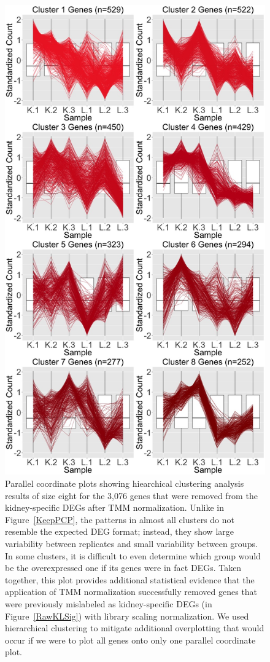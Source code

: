 \documentclass{article}
\begin{document}
\null
\begin{figure}[t!]
\centerline{\includegraphics[width=0.65\columnwidth]{../Bioinformatics/Pictures/liverKidney/Clustering_data_FDR_001_TMMvRaw_Removed/K_L_8.jpg}}
\caption{Parallel coordinate plots showing hiearchical clustering analysis results of size eight for the 3,076 genes that were removed from the kidney-specific DEGs after TMM normalization. Unlike in Figure~\ref{KeepPCP}, the patterns in almost all clusters do not resemble the expected DEG format; instead, they show large variability between replicates and small variability between groups. In some clusters, it is difficult to even determine which group would be the overexpressed one if its genes were in fact DEGs. Taken together, this plot provides additional statistical evidence that the application of TMM normalization successfully removed genes that were previously mislabeled as kidney-specific DEGs (in Figure~\ref{RawKLSig}) with library scaling normalization. We used hierarchical clustering to mitigate additional overplotting that would occur if we were to plot all genes onto only one parallel coordinate plot.
\label{RemovePCP}}
\end{figure}
\end{document}
